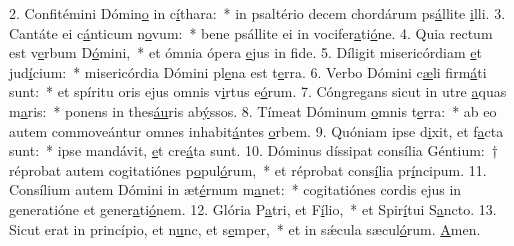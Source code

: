 2. Confitémini Dómin\uline{o} in c\uline{í}thara:~* in psaltério decem chordárum ps\uline{á}llite \uline{i}lli.
3. Cantáte ei c\uline{á}nticum n\uline{o}vum:~* bene psállite ei in vocifer\uline{a}ti\uline{ó}ne.
4. Quia rectum est v\uline{e}rbum D\uline{ó}mini,~* et ómnia ópera \uline{e}jus in f\uline{i}de.
5. Díligit misericórdiam \uline{e}t jud\uline{í}cium:~* misericórdia Dómini pl\uline{e}na est t\uline{e}rra.
6. Verbo Dómini c\uline{æ}li firm\uline{á}ti sunt:~* et spíritu oris ejus omnis v\uline{i}rtus e\uline{ó}rum.
7. Cóngregans sicut in utre \uline{a}quas m\uline{a}ris:~* ponens in thes\uline{áu}ris ab\uline{ý}ssos.
8. Tímeat Dóminum \uline{o}mnis t\uline{e}rra:~* ab eo autem commoveántur omnes inhabit\uline{á}ntes \uline{o}rbem.
9. Quóniam ipse d\uline{i}xit, et f\uline{a}cta sunt:~* ipse mandávit, \uline{e}t cre\uline{á}ta sunt.
10. Dóminus díssipat consília Géntium:~† réprobat autem cogitatiónes p\uline{o}pul\uline{ó}rum,~* et réprobat cons\uline{í}lia pr\uline{í}ncipum.
11. Consílium autem Dómini in æt\uline{é}rnum m\uline{a}net:~* cogitatiónes cordis ejus in generatióne et gener\uline{a}ti\uline{ó}nem.
12. Glória P\uline{a}tri, et F\uline{í}lio,~* et Spir\uline{í}tui S\uline{a}ncto.
13. Sicut erat in princípio, et n\uline{u}nc, et s\uline{e}mper,~* et in sǽcula sæcul\uline{ó}rum. \uline{A}men.
